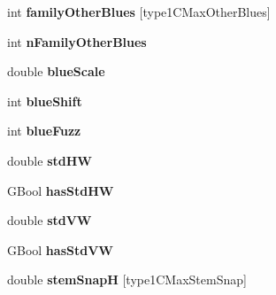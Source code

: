 \begin{DoxyCompactItemize}
\item 
\mbox{\label{struct_type1_c_private_dict_a1b974e5cd737230fa0d78a31159c8a2b}} 
int {\bfseries family\+Other\+Blues} \mbox{[}type1\+C\+Max\+Other\+Blues\mbox{]}
\item 
\mbox{\label{struct_type1_c_private_dict_aa72fc011159820bc5930ca1053f1b738}} 
int {\bfseries n\+Family\+Other\+Blues}
\item 
\mbox{\label{struct_type1_c_private_dict_ab5a58532b4b0a5c4f6bf8ac9ceee8676}} 
double {\bfseries blue\+Scale}
\item 
\mbox{\label{struct_type1_c_private_dict_a5e382d9b33844009157e5232f08f143c}} 
int {\bfseries blue\+Shift}
\item 
\mbox{\label{struct_type1_c_private_dict_a7e29746043981860871f60cfa4258fe5}} 
int {\bfseries blue\+Fuzz}
\item 
\mbox{\label{struct_type1_c_private_dict_aed2e1906edb6f6a0720bcd73bdd55bc6}} 
double {\bfseries std\+HW}
\item 
\mbox{\label{struct_type1_c_private_dict_a460fda2546e08da9e82fe6837f4761b4}} 
G\+Bool {\bfseries has\+Std\+HW}
\item 
\mbox{\label{struct_type1_c_private_dict_a882ab845f56f63870715b29282349c26}} 
double {\bfseries std\+VW}
\item 
\mbox{\label{struct_type1_c_private_dict_a0bd22595002714a05efbbe2637682273}} 
G\+Bool {\bfseries has\+Std\+VW}
\item 
\mbox{\label{struct_type1_c_private_dict_a69cc967c51d1cf139f1ef2a025edc688}} 
double {\bfseries stem\+SnapH} \mbox{[}type1\+C\+Max\+Stem\+Snap\mbox{]}
\item 
\mbox{\label{struct_type1_c_private_dict_a0b782fb3cf35a2da8d2e97558e7c9a68}} 

\end{DoxyCompactItemize}
